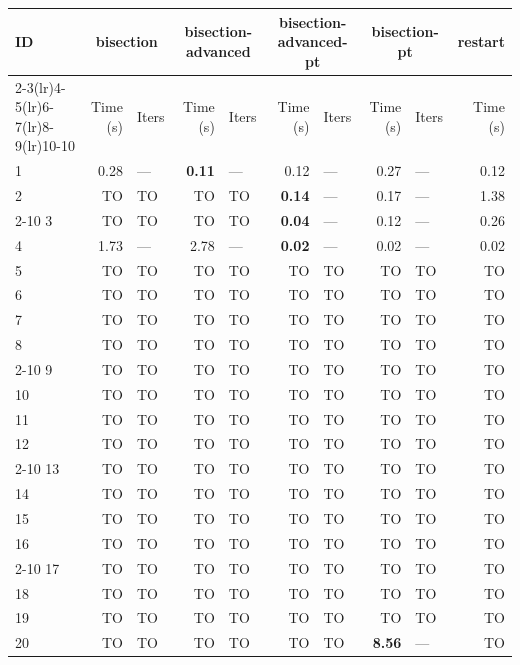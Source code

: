 \begin{longtable}{lr@{\hskip 4pt}l@{\hskip 12pt}r@{\hskip 4pt}l@{\hskip 12pt}r@{\hskip 4pt}l@{\hskip 12pt}r@{\hskip 4pt}l@{\hskip 12pt}r}
\toprule
ID & \multicolumn{2}{c}{bisection} & \multicolumn{2}{c}{bisection-advanced} & \multicolumn{2}{c}{bisection-advanced-pt} & \multicolumn{2}{c}{bisection-pt} & restart \\
\cmidrule(lr){2-3}\cmidrule(lr){4-5}\cmidrule(lr){6-7}\cmidrule(lr){8-9}\cmidrule(lr){10-10}
 & Time (s) &  Iters & Time (s) &  Iters & Time (s) &  Iters & Time (s) &  Iters & Time (s) \\
\midrule
\endhead
1 & 0.28 & --- & \textbf{0.11} & --- & 0.12 & --- & 0.27 & --- & 0.12 \\
2 & TO & TO & TO & TO & \textbf{0.14} & --- & 0.17 & --- & 1.38 \\
\cmidrule{2-10}
3 & TO & TO & TO & TO & \textbf{0.04} & --- & 0.12 & --- & 0.26 \\
4 & 1.73 & --- & 2.78 & --- & \textbf{0.02} & --- & 0.02 & --- & 0.02 \\
\midrule
5 & TO & TO & TO & TO & TO & TO & TO & TO & TO \\
6 & TO & TO & TO & TO & TO & TO & TO & TO & TO \\
7 & TO & TO & TO & TO & TO & TO & TO & TO & TO \\
8 & TO & TO & TO & TO & TO & TO & TO & TO & TO \\
\cmidrule{2-10}
9 & TO & TO & TO & TO & TO & TO & TO & TO & TO \\
10 & TO & TO & TO & TO & TO & TO & TO & TO & TO \\
11 & TO & TO & TO & TO & TO & TO & TO & TO & TO \\
12 & TO & TO & TO & TO & TO & TO & TO & TO & TO \\
\cmidrule{2-10}
13 & TO & TO & TO & TO & TO & TO & TO & TO & TO \\
14 & TO & TO & TO & TO & TO & TO & TO & TO & TO \\
15 & TO & TO & TO & TO & TO & TO & TO & TO & TO \\
16 & TO & TO & TO & TO & TO & TO & TO & TO & TO \\
\cmidrule{2-10}
17 & TO & TO & TO & TO & TO & TO & TO & TO & TO \\
18 & TO & TO & TO & TO & TO & TO & TO & TO & TO \\
19 & TO & TO & TO & TO & TO & TO & TO & TO & TO \\
20 & TO & TO & TO & TO & TO & TO & \textbf{8.56} & --- & TO \\

\end{longtable}
